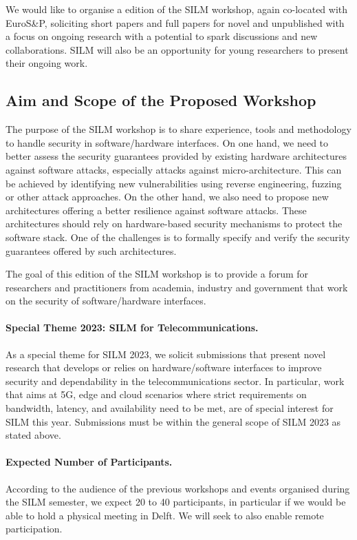 \documentclass[a4paper,11pt]{article}
\newcommand{\SILMNum}{\nth{5}}
\newcommand{\SILMYear}{2023}
\begin{document}
We would like to organise a \SILMNum{} edition of the SILM workshop, again
co-located with EuroS\&P, soliciting short papers and full papers for novel
and unpublished with a focus on ongoing research with a potential to spark
discussions and new collaborations. SILM will also be an opportunity for
young researchers to present their ongoing work.

\subsection{Aim and Scope of the Proposed Workshop}
%
The purpose of the SILM workshop is to share experience, tools and
methodology to handle security in software/hardware interfaces. On one
hand, we need to better assess the security guarantees provided by existing
hardware architectures against software attacks, especially attacks against
micro-architecture. This can be achieved by identifying new vulnerabilities
using reverse engineering, fuzzing or other attack approaches. On the other
hand, we also need to propose new architectures offering a better
resilience against software attacks. These architectures should rely on
hardware-based security mechanisms to protect the software stack. One of
the challenges is to formally specify and verify the security guarantees
offered by such architectures.

The goal of this \SILMNum{} edition of the SILM workshop is to provide a forum
for  researchers and practitioners from academia, industry and government
that work on the security of software/hardware interfaces.

\paragraph{Special Theme \SILMYear{}: SILM for Telecommunications.}
%
As a special theme for SILM \SILMYear{}, we solicit submissions that
present novel research that develops or relies on hardware/software
interfaces to improve security and dependability in the telecommunications
sector. In particular, work that aims at 5G, edge and cloud scenarios where
strict requirements on bandwidth, latency, and availability need to be met,
are of special interest for SILM this year. Submissions must be within the
general scope of SILM \SILMYear{} as stated above.

\paragraph{Expected Number of Participants.}
%
According to the audience of the previous workshops and events organised
during the SILM semester, we expect 20 to 40 participants, in particular if
we would be able to hold a physical meeting in Delft. We will seek to also
enable remote participation.
\end{document}
